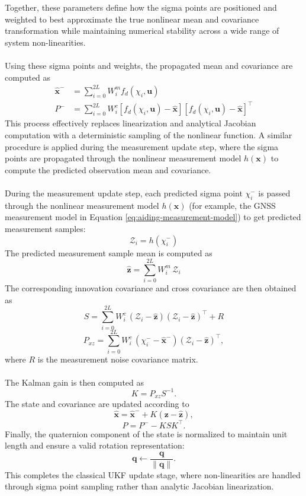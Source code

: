 \\ \\  
Together, these parameters define how the sigma points are positioned and weighted to best approximate the true nonlinear mean and covariance transformation while maintaining numerical stability across a wide range of system non-linearities. 
\\ \\  
Using these sigma points and weights, the propagated mean and covariance are computed as
$$
\begin{aligned}
    \hat{\mathbf{x}}^- &= \sum_{i=0}^{2L} W_i^m f_d(\chi_i, \mathbf{u}) \\
    P^- &= \sum_{i=0}^{2L} W_i^c [f_d(\chi_i, \mathbf{u}) - \hat{\mathbf{x}}][f_d(\chi_i, \mathbf{u}) - \hat{\mathbf{x}}]^\top
\end{aligned}
$$
This process effectively replaces linearization and analytical Jacobian computation with a deterministic sampling of the nonlinear function. A similar procedure is applied during the measurement update step, where the sigma points are propagated through the nonlinear measurement model $h(\mathbf{x})$ to compute the predicted observation mean and covariance.
\\ \\
During the measurement update step, each predicted sigma point $\chi_i^-$ is passed through the nonlinear measurement model $h(\mathbf{x})$ (for example, the GNSS measurement model in Equation \ref{eq:aiding-measurement-model}) to get predicted measurement samples:
$$
    \mathcal{Z}_i = h(\chi_i^-)
$$
The predicted measurement sample mean is computed as
$$
    \hat{\mathbf{z}} = \sum_{i=0}^{2L} W_i^m \, \mathcal{Z}_i
$$
The corresponding innovation covariance and cross covariance are then obtained as
$$
    S = \sum_{i=0}^{2L} W_i^c \, (\mathcal{Z}_i - \hat{\mathbf{z}})(\mathcal{Z}_i - \hat{\mathbf{z}})^\top + R
$$
$$
    P_{xz} = \sum_{i=0}^{2L} W_i^c \, (\chi_i^- - \hat{\mathbf{x}}^-)(\mathcal{Z}_i - \hat{\mathbf{z}})^\top,
$$
where $R$ is the measurement noise covariance matrix.  
\\ \\
The Kalman gain is then computed as
$$
    K = P_{xz} S^{-1}.
$$
The state and covariance are updated according to
$$
    \hat{\mathbf{x}} = \hat{\mathbf{x}}^- + K(\mathbf{z} - \hat{\mathbf{z}}),
$$
$$
    P = P^- - K S K^\top.
$$
Finally, the quaternion component of the state is normalized to maintain unit length and ensure a valid rotation representation:
$$
    \mathbf{q} \leftarrow \frac{\mathbf{q}}{\|\mathbf{q}\|}.
$$
This completes the classical UKF update stage, where non-linearities are handled through sigma point sampling rather than analytic Jacobian linearization.



